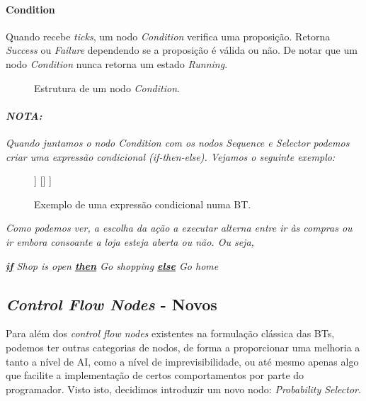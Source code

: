 \paragraph{Condition}{
    Quando recebe \textit{ticks}, um nodo \textit{Condition} verifica uma proposição.
    Retorna \textit{Success} ou \textit{Failure} dependendo se a proposição é válida ou não.
    De notar que um nodo \textit{Condition} nunca retorna um estado \textit{Running}.

    \begin{figure}[H]
    \centering
    \begin{behavior}
    \end{behavior}
    \caption{Estrutura de um nodo \textit{Condition}.}
    \label{fig:2.8}
    \end{figure}

    \hr
    \paragraph{\textit{NOTA:}}{
        \textit{
        Quando juntamos o nodo Condition com os nodos Sequence e Selector podemos criar uma expressão condicional (if-then-else). Vejamos o seguinte exemplo:
        }
        \begin{figure}[H]
        \centering
        \begin{behavior}
            [\selector
                [\sequence
                    [\condition{Shop is open}]
                    [\action{Go shopping}]
                ]
                []
            ]
        \end{behavior}
        \caption{Exemplo de uma expressão condicional numa BT.}
        \label{fig:2.9}
        \end{figure}

        \textit{
        Como podemos ver, a escolha da ação a executar alterna entre ir às compras ou ir embora consoante a loja esteja aberta ou não. Ou seja,
        }

        \begin{center}
            \textit{
            \underline{\textbf{if}} Shop is open \underline{\textbf{then}} Go shopping \underline{\textbf{else}} Go home
            }
        \end{center}
    }
    \hr
}



\subsection{\textit{Control Flow Nodes} - Novos}
Para além dos \textit{control flow nodes} existentes na formulação clássica das BTs, podemos ter outras categorias de nodos, de forma a proporcionar uma melhoria a tanto a nível de AI, como a nível de imprevisibilidade, ou até mesmo apenas algo que facilite a implementação de certos comportamentos por parte do programador.
Visto isto, decidimos introduzir um novo nodo: \textit{Probability Selector}.

